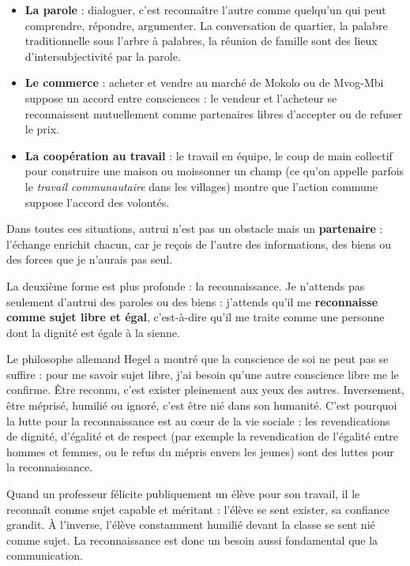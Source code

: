 \documentclass[11pt]{article}
\newcommand{\cle}[1]{{\popxbold\color{popdark}#1}}
\newcounter{popsec}
\newcounter{popsub}
\newcommand{\courssub}[1]{%
  \stepcounter{popsub}%
  \par\vspace{9pt}\noindent{\popxbold\fontsize{11.5}{13}\selectfont\color{popink}{\color{poporange}\thepopsec.\thepopsub}\hspace{6pt}#1}\par\nopagebreak\vspace{4pt}
}
\begin{document}
\begin{itemize}
\item \textbf{La parole} : dialoguer, c'est reconnaître l'autre comme quelqu'un qui peut comprendre, répondre, argumenter. La conversation de quartier, la palabre traditionnelle sous l'arbre à palabres, la réunion de famille sont des lieux d'intersubjectivité par la parole.
\item \textbf{Le commerce} : acheter et vendre au marché de Mokolo ou de Mvog-Mbi suppose un accord entre consciences : le vendeur et l'acheteur se reconnaissent mutuellement comme partenaires libres d'accepter ou de refuser le prix.
\item \textbf{La coopération au travail} : le travail en équipe, le coup de main collectif pour construire une maison ou moissonner un champ (ce qu'on appelle parfois le \emph{travail communautaire} dans les villages) montre que l'action commune suppose l'accord des volontés.
\end{itemize}

Dans toutes ces situations, autrui n'est pas un obstacle mais un \textbf{partenaire} : l'échange enrichit chacun, car je reçois de l'autre des informations, des biens ou des forces que je n'aurais pas seul.

\courssub{Deuxième forme : la reconnaissance}

La deuxième forme est plus profonde : la \cle{reconnaissance}. Je n'attends pas seulement d'autrui des paroles ou des biens : j'attends qu'il me \textbf{reconnaisse comme sujet libre et égal}, c'est-à-dire qu'il me traite comme une personne dont la dignité est égale à la sienne.

Le philosophe allemand \cle{Hegel} a montré que la conscience de soi ne peut pas se suffire : pour me savoir sujet libre, j'ai besoin qu'une autre conscience libre me le confirme. Être reconnu, c'est exister pleinement aux yeux des autres. Inversement, être méprisé, humilié ou ignoré, c'est être nié dans son humanité. C'est pourquoi la lutte pour la reconnaissance est au cœur de la vie sociale : les revendications de dignité, d'égalité et de respect (par exemple la revendication de l'égalité entre hommes et femmes, ou le refus du mépris envers les jeunes) sont des luttes pour la reconnaissance.

\begin{exemplebox}
Quand un professeur félicite publiquement un élève pour son travail, il le reconnaît comme sujet capable et méritant : l'élève se sent exister, sa confiance grandit. À l'inverse, l'élève constamment humilié devant la classe se sent nié comme sujet. La reconnaissance est donc un besoin aussi fondamental que la communication.
\end{exemplebox}
\end{document}
